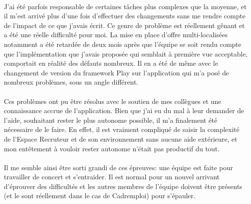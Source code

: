 \paragraph{}
J'ai été parfois responsable de certaines tâches plus complexes que la moyenne, et il m'est arrivé plus d'une fois d'effectuer des changements sans me rendre compte de l'impact de ce que j'avais écrit.
Ce genre de problème est réellement gênant et a été une réelle difficulté pour moi.
La mise en place d'offre multi-localisées notamment a été retardée de deux mois après que l'équipe se soit rendu compte que l'implémentation que j'avais proposée qui semblait à première vue acceptable, comportait en réalité des défauts nombreux.
Il en a été de même avec le changement de version du framework Play sur l'application qui m'a posé de nombreux problèmes, sous un angle différent.
\paragraph{}
Ces problèmes ont pu être résolus avec le soutien de mes collègues et une connaissance accrue de l'application.
Bien que j'ai eu du mal à leur demander de l'aide, souhaitant rester le plus autonome possible, il m'a finalement été nécessaire de le faire.
En effet, il est vraiment compliqué de saisir la complexité de l'Espace Recruteur et de son environnement sans aucune aide extérieure, et mon entêtement à vouloir rester autonome n'était pas productif du tout.
\paragraph{}
Il me semble ainsi être sorti grandi de ces épreuves: une équipe est faite pour travailler de concert et s'entraider.
Il est normal pour un nouvel arrivant d'éprouver des difficultés et les autres membres de l'équipe doivent être présents (et le sont réellement dans le cas de Cadremploi) pour s'épauler.
